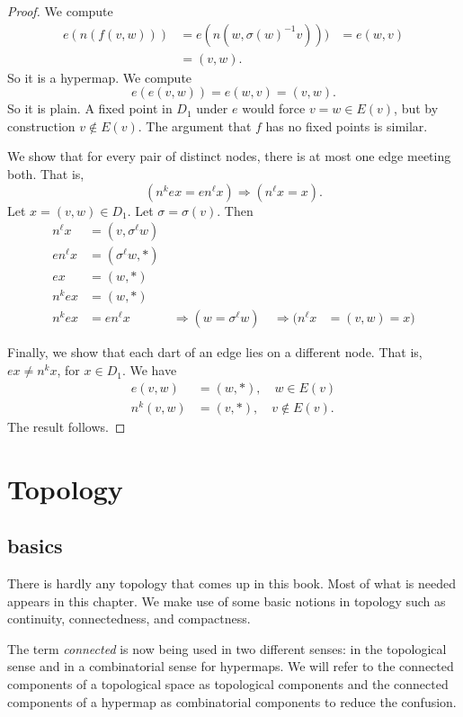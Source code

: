 \begin{proof}  We compute
    $$
\begin{array}{lll}
e(n(f(v,w))) &= e(n(w,\sigma(w)^{-1} v))) &=
        e(w,v)\\ 
&= (v,w).
\end{array}
$$
So it is a hypermap. We compute
    $$e(e(v,w)) = e(w,v) = (v,w).$$
So it is plain. A fixed point in $D_1$ under $e$ would force $v = w\in E(v)$,
but by construction $v\not\in E(v)$.  The argument that $f$ has no
fixed points is similar.

   We show that for every pair of distinct nodes, there is at most one edge
meeting both.
That is,
        $$(n^k e x = e n^\ell x)\Rightarrow (n^\ell x = x).$$
Let $x = (v,w)\in D_1$.  Let $\sigma=\sigma(v)$. Then
    $$
    \begin{array}{lllllll}
    n^\ell x &= (v,\sigma^\ell w)\\
    e n^\ell x &= (\sigma^\ell w,*)\\
    e x &= (w,*)\\
    n^k e x &= (w,*)\\
    n^k e x &= e n^\ell x &\ \Rightarrow (w = \sigma^\ell w) &\ \Rightarrow
    (n^\ell x &= (v,w) = x)
    \end{array}
    $$

Finally, we show that each dart of an edge lies on a different node.
That is, $e x \ne n^k x$, for $x\in D_1$.  We have
    $$
    \begin{array}{lll}
        e(v,w) &= (w,*),\quad w\in E(v)\\
        n^k(v,w) &= (v,*),\quad v\not\in E(v).
    \end{array}
    $$
The result follows.
\end{proof}

\section{Topology}\label{sec:topology}

\subsection{basics}

There is hardly any topology that comes up in this book.  Most of
what is needed appears in this chapter.  We make use of some basic
notions in topology such as continuity, connectedness, and compactness.

\begin{remark} The term {\it connected} is now being used in
two different senses: in the topological sense and in a combinatorial
sense for hypermaps.   We will refer to the connected components
of a topological space as topological components and the connected
components of a hypermap as combinatorial components to reduce the confusion.
\end{remark}






